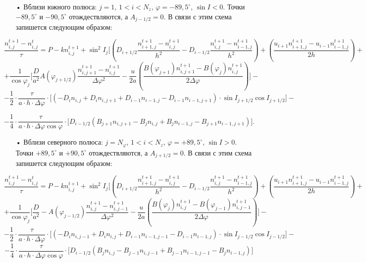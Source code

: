 \documentclass[2pt, a4paper, fleqn]{extarticle}
\begin{document}
\begin{itemize}
\item[•] Вблизи южного полюса: $j = 1$, $1<i<N_z$, $\varphi = -89{,}5^\circ$, $\sin I < 0$. Точки $-89{,}5^\circ$ и $-90{,}5^\circ$ отождествляются, а $A_{j-1/2} = 0$. В связи с этим схема запишется следующим образом: 
\end{itemize}
$$\dfrac{n_{i,j}^{t+1}-n_{i,j}^t}{\tau} = P - k n_{i, j}^{t+1} + \sin^2 I_j\bigg[\left(D_{i+1/2}\dfrac{n_{i+1, j}^{t+1}-n_{i,j}^{t+1}}{h^2}-D_{i-1/2}\dfrac{n_{i,j}^{t+1}-n_{i-1,j}^{t+1}}{h^2}\right)+\left(\dfrac{u_{i+1}n_{i+1,j}^{t+1}-u_{i-1}n_{i-1,j}^{t+1}}{2h}\right) + $$ $$+\dfrac{1}{\cos\varphi_j} \bigg[\dfrac{D}{a^2}A(\varphi_{j+1/2})\dfrac{n_{i, j+1}^{t+1}-n_{i,j}^{t+1}}{\Delta\varphi^2}-\dfrac{u}{2a}\left(\dfrac{B(\varphi_{j+1})n_{i,j+1}^{t+1}-B(\varphi_{j})n_{i,j}^{t+1}}{2\Delta\varphi}\right)\bigg] -$$ 
$$-\dfrac{1}{2}\cdot\dfrac{\tau}{a\cdot h\cdot \Delta\varphi}\cdot\bigg[(-D_i n_{i, j} + D_i n_{i, j+1} + D_{i-1} n_{i-1, j} - D_{i-1} n_{i-1, j+1})\cdot \sin I_{j+1/2}\cos I_{j+1/2}\bigg]-$$

$$-\dfrac{1}{4}\cdot\dfrac{\tau}{a\cdot h\cdot \Delta\varphi\cos\varphi}\cdot\bigg[D_{i-1/2}(B_{j+1} n_{i, j+1} - B_{j}n_{i, j} + B_{j}n_{i-1, j} - B_{j+1} n_{i-1, j+1})\bigg].$$

\begin{itemize}
\item[•] Вблизи северного полюса: $j = N_{\varphi}$, $1<i<N_z$, $\varphi = +89{,}5^\circ$, $\sin I > 0$. Точки $+89{,}5^\circ$ и $+90{,}5^\circ$ отождествляются, а $A_{j+1/2} = 0$. В связи с этим схема запишется следующим образом: 
\end{itemize}
$$\dfrac{n_{i,j}^{t+1}-n_{i,j}^t}{\tau} = P - k n_{i, j}^{t+1} + \sin^2 I_j\bigg[\left(D_{i+1/2}\dfrac{n_{i+1, j}^{t+1}-n_{i,j}^{t+1}}{h^2}-D_{i-1/2}\dfrac{n_{i,j}^{t+1}-n_{i-1,j}^{t+1}}{h^2}\right)+\left(\dfrac{u_{i+1}n_{i+1,j}^{t+1}-u_{i-1}n_{i-1,j}^{t+1}}{2h}\right) + $$ $$+\dfrac{1}{\cos\varphi_j} \bigg[\dfrac{D}{a^2}-A(\varphi_{j-1/2})\dfrac{n_{i,j}^{t+1}-n_{i,j-1}^{t+1}}{\Delta\varphi^2}-\dfrac{u}{2a}\left(\dfrac{B(\varphi_{j})n_{i,j}^{t+1}-B(\varphi_{j-1})n_{i,j-1}^{t+1}}{2\Delta\varphi}\right)\bigg] -$$
$$-\dfrac{1}{2}\cdot\dfrac{\tau}{a\cdot h\cdot \Delta\varphi}\cdot\bigg[(-D_i n_{i, j-1} + D_i n_{i, j} + D_{i-1} n_{i-1, j-1} - D_{i-1} n_{i-1, j})\cdot \sin I_{j-1/2}\cos I_{j-1/2}\bigg]-$$
$$-\dfrac{1}{4}\cdot\dfrac{\tau}{a\cdot h\cdot \Delta\varphi\cos\varphi}\cdot\bigg[D_{i-1/2}(B_j n_{i, j} - B_{j-1}n_{i, j-1} + B_{j-1}n_{i-1, j-1} - B_j n_{i-1, j})\bigg]$$
\end{document}
